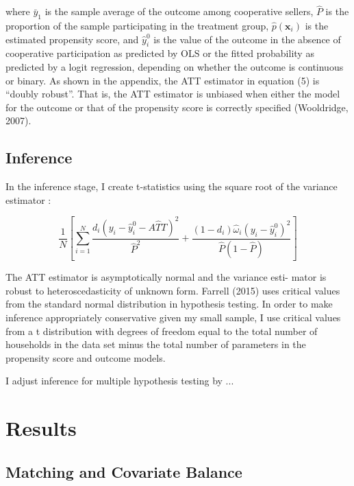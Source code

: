 \documentclass[11pt]{article}
\begin{document}
where $\bar{y}_1$ is the sample average of the outcome among cooperative sellers, $\hat{P}$ is the proportion of the sample participating in the treatment group, $\hat{p}\left(\mathbf{x}_{i}\right)$ is the estimated propensity score, and $\hat{y}_{i}^{0}$ is the value of the outcome in the absence of cooperative participation as predicted by OLS or the fitted probability as predicted by a logit regression, depending on whether the outcome is continuous or binary. As shown in the appendix, the ATT estimator in equation (5) is “doubly robust”. That is, the ATT estimator is unbiased when either the model for the outcome or that of the propensity score is correctly specified (Wooldridge, 2007). 


\subsection{Inference}

In the inference stage, I create t-statistics using the square root of the variance estimator \citet{farrell_robust_2015}:

\begin{equation}
\frac{1}{N}\left[\sum_{i=1}^{N} \frac{d_{i}\left(y_{i}-\hat{y}_{i}^{0}-A \hat{T} T\right)^{2}}{\hat{P}^{2}}+\frac{\left(1-d_{i}\right) \hat{\omega}_{i}\left(y_{i}-\hat{y}_{i}^{0}\right)^{2}}{\hat{P}(1-\hat{P})}\right]
\end{equation}

The ATT estimator is asymptotically normal and the variance esti- mator is robust to heteroscedasticity of unknown form. Farrell (2015) uses critical values from the standard normal distribution in hypothesis testing. In order to make inference appropriately conservative given my small sample, I use critical values from a t distribution with degrees of freedom equal to the total number of households in the data set minus the total number of parameters in the propensity score and outcome models.

I adjust inference for multiple hypothesis testing by ... 

\section{Results}

\subsection{Matching and Covariate Balance}
\end{document}
